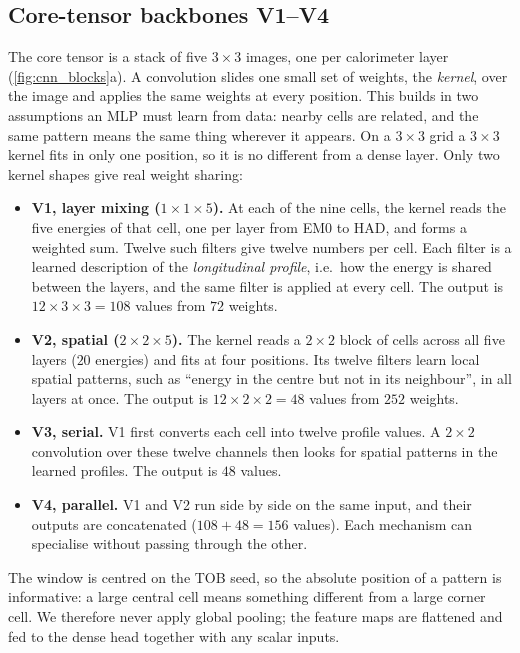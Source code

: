 \subsection{Core-tensor backbones V1--V4}
\label{app:vbackbones}
The core tensor is a stack of five $3\times3$ images, one per calorimeter layer (\cref{fig:cnn_blocks}a). A convolution slides one small set of weights, the \emph{kernel}, over the image and applies the same weights at every position. This builds in two assumptions an MLP must learn from data: nearby cells are related, and the same pattern means the same thing wherever it appears. On a $3\times3$ grid a $3\times3$ kernel fits in only one position, so it is no different from a dense layer. Only two kernel shapes give real weight sharing:
\begin{itemize}
  \item \textbf{V1, layer mixing ($1\times1\times5$).} At each of the nine cells, the kernel reads the five energies of that cell, one per layer from EM0 to HAD, and forms a weighted sum. Twelve such filters give twelve numbers per cell. Each filter is a learned description of the \emph{longitudinal profile}, i.e.\ how the energy is shared between the layers, and the same filter is applied at every cell. The output is $12\times3\times3=108$ values from $72$ weights.
  \item \textbf{V2, spatial ($2\times2\times5$).} The kernel reads a $2\times2$ block of cells across all five layers ($20$ energies) and fits at four positions. Its twelve filters learn local spatial patterns, such as ``energy in the centre but not in its neighbour'', in all layers at once. The output is $12\times2\times2=48$ values from $252$ weights.
  \item \textbf{V3, serial.} V1 first converts each cell into twelve profile values. A $2\times2$ convolution over these twelve channels then looks for spatial patterns in the learned profiles. The output is $48$ values.
  \item \textbf{V4, parallel.} V1 and V2 run side by side on the same input, and their outputs are concatenated ($108+48=156$ values). Each mechanism can specialise without passing through the other.
\end{itemize}
The window is centred on the TOB seed, so the absolute position of a pattern is informative: a large central cell means something different from a large corner cell. We therefore never apply global pooling; the feature maps are flattened and fed to the dense head together with any scalar inputs.

